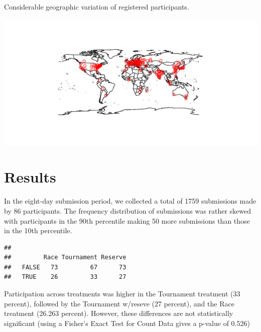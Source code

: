 \documentclass[12pt,]{article}
\theoremstyle{plain} %
\begin{document}
Considerable geographic variation of registered participants.

\includegraphics{Figures/unnamed-chunk-9-1.pdf}

\clearpage

\section{Results}\label{results}

In the eight-day submission period, we collected a total of 1759
submissions made by 86 participants. The frequency distribution of
submissions was rather skewed with participants in the 90th percentile
making 50 more submissions than those in the 10th percentile.

\begin{verbatim}
##        
##         Race Tournament Reserve
##   FALSE   73         67      73
##   TRUE    26         33      27
\end{verbatim}

Participation across treatments was higher in the Tournament treatment
(33 percent), followed by the Tournament w/reseve (27 percent), and the
Race treatment (26.263 percent). However, these differences are not
statistically significant (using a Fisher's Exact Test for Count Data
gives a p-value of 0.526)
\end{document}
